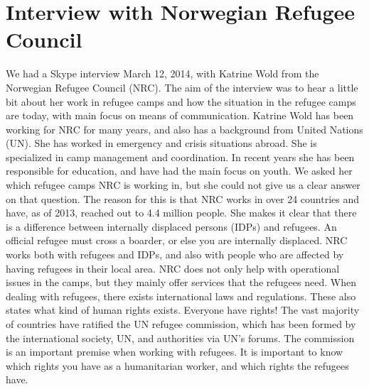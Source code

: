 \section{Interview with Norwegian Refugee Council}
\label{sec:interviewnrc}
We had a Skype interview March 12, 2014, with Katrine Wold from the Norwegian Refugee Council (NRC). The aim of the interview was to hear a little bit about her work in refugee camps and how the situation in the refugee camps are today, with main focus on means of communication.
Katrine Wold has been working for NRC for many years, and also has a background from United Nations (UN). She has worked in emergency and crisis situations abroad. She is specialized in camp management and coordination. In recent years she has been responsible for education, and have had the main focus on youth. We asked her which refugee camps NRC is working in, but she could not give us a clear answer on that question. The reason for this is that NRC works in over 24 countries and have, as of 2013, reached out to 4.4 million people. She makes it clear that there is a difference between internally displaced persons (IDPs) and refugees. An official refugee must cross a boarder, or else you are internally displaced. NRC works both with refugees and IDPs, and also with people who are affected by having refugees in their local area. NRC does not only help with operational issues in the camps, but they mainly offer services that the refugees need. When dealing with refugees, there exists international laws and regulations. These also states what kind of human rights exists. Everyone have rights! The vast majority of countries have ratified the UN refugee commission, which has been formed by the international society, UN, and authorities via UN's forums. The commission is an important premise when working with refugees. It is important to know which rights you have as a humanitarian worker, and which rights the refugees have. 

